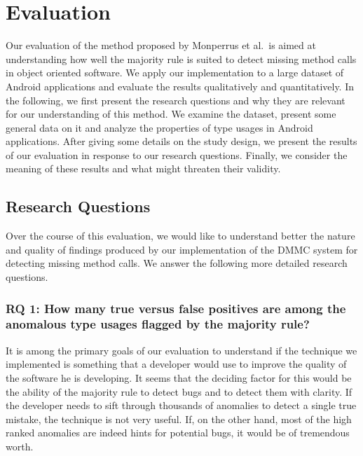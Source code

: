 \chapter{Evaluation}\label{ch:eval}

Our evaluation of the method proposed by Monperrus et al.\ is aimed at understanding how well the majority rule is suited to detect missing method calls in object oriented software.
We apply our implementation to a large dataset of Android applications and evaluate the results qualitatively and quantitatively.
In the following, we first present the research questions and why they are relevant for our understanding of this method.
We examine the dataset, present some general data on it and analyze the properties of type usages in Android applications.
After giving some details on the study design, we present the results of our evaluation in response to our research questions.
Finally, we consider the meaning of these results and what might threaten their validity.

\section{Research Questions}\label{sc:rq}

Over the course of this evaluation, we would like to understand better the nature and quality of findings produced by our implementation of the $\text{DMMC}$ system for detecting missing method calls.
We answer the following more detailed research questions.

\subsection{RQ 1: How many true versus false positives are among the anomalous type usages flagged by the majority rule?}

It is among the primary goals of our evaluation to understand if the technique we implemented is something that a developer would use to improve the quality of the software he is developing.
It seems that the deciding factor for this would be the ability of the majority rule to detect bugs and to detect them with clarity.
If the developer needs to sift through thousands of anomalies to detect a single true mistake, the technique is not very useful.
If, on the other hand, most of the high ranked anomalies are indeed hints for potential bugs, it would be of tremendous worth.

